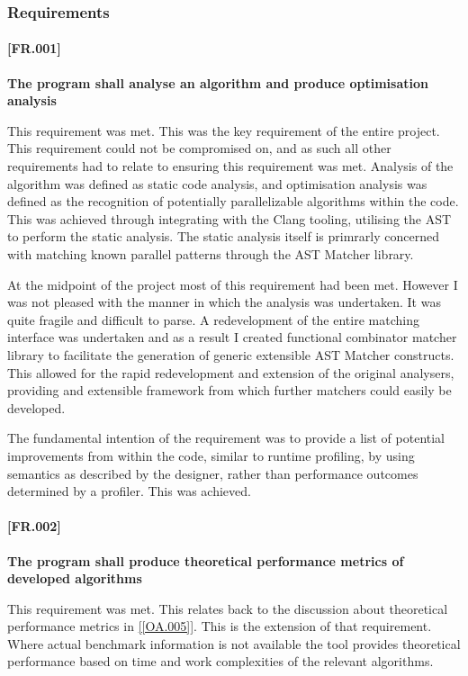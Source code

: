 \subsubsection{Requirements}

\paragraph{[FR.001]}
\textbf{The program shall analyse an algorithm and produce optimisation analysis}

This requirement was met. This was the key requirement of the entire project. This requirement could
not be compromised on, and as such all other requirements had to relate to ensuring this requirement
was met. Analysis of the algorithm was defined as static code analysis, and optimisation analysis
was defined as the recognition of potentially parallelizable algorithms within the code. This was
achieved through integrating with the Clang tooling, utilising the AST to perform the static
analysis. The static analysis itself is primrarly concerned with matching known parallel patterns
through the AST Matcher library.  

At the midpoint of the project most of this requirement had been met. However I was not pleased with
the manner in which the analysis was undertaken. It was quite fragile and difficult to parse. A
redevelopment of the entire matching interface was undertaken and as a result I created functional
combinator matcher library to facilitate the generation of generic extensible AST Matcher
constructs. This allowed for the rapid redevelopment and extension of the original analysers,
providing and extensible framework from which further matchers could easily be developed.

The fundamental intention of the requirement was to provide a list of potential improvements from
within the code, similar to runtime profiling, by using semantics as described by the designer,
rather than performance outcomes determined by a profiler. This was achieved.

\paragraph{[FR.002]} \label{[FR.002]}
\textbf{The program shall produce theoretical performance metrics of developed algorithms}

This requirement was met. This relates back to the discussion about theoretical performance metrics
in \ref{[OA.005]}. This is the extension of that requirement. Where actual benchmark information is
not available the tool provides theoretical performance based on time and work complexities of the
relevant algorithms.

